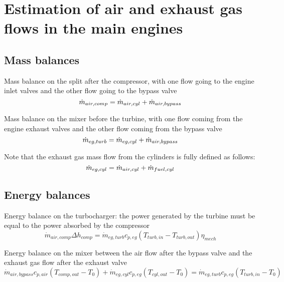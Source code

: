 \section{Estimation of air and exhaust gas flows in the main engines}

\subsection{Mass balances}

Mass balance on the split after the compressor, with one flow going to the engine inlet valves and the other flow going to the bypass valve
\begin{equation}
\dot{m}_{air,comp} = \dot{m}_{air,cyl} + \dot{m}_{air,bypass} \\
\end{equation}

Mass balance on the mixer before the turbine, with one flow coming from the engine exhaust valves and the other flow coming from the bypass valve
\begin{equation}
\dot{m}_{eg,turb} = \dot{m}_{eg,cyl} + \dot{m}_{air,bypass} \\
\end{equation}

Note that the exhaust gas mass flow from the cylinders is fully defined as follows:
\begin{equation}
\dot{m}_{eg,cyl} = \dot{m}_{air,cyl} + \dot{m}_{fuel,cyl} \\
\end{equation}

\subsection{Energy balances}

Energy balance on the turbocharger: the power generated by the turbine must be equal to the power absorbed by the compressor
\begin{equation}
\dot{m}_{air,comp} \Delta h_{comp} = \dot{m}_{eg,turb} c_{p,eg} (T_{turb,in} - T_{turb,out}) \eta_{mech}
\end{equation}

Energy balance on the mixer between the air flow after the bypass valve and the exhaust gas flow after the exhaust valve
\begin{equation}
\dot{m}_{air,bypass} c_{p,air} (T_{comp,out} - T_0) + \dot{m}_{eg,cyl} c_{p,eg}  (T_{cyl,out} - T_0) = \dot{m}_{eg,turb} c_{p,eg} (T_{turb,in} - T_0)
\end{equation}


